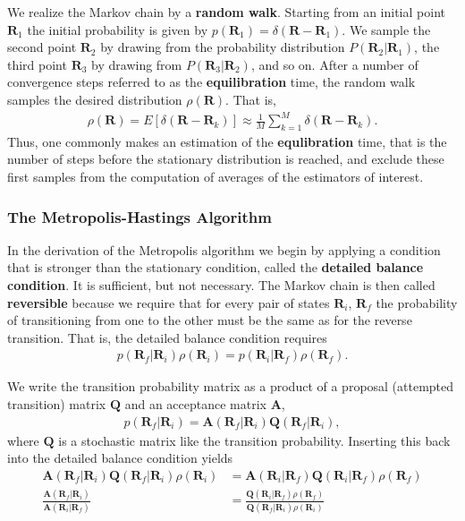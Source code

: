 \documentclass[twoside,english]{uiofysmaster}
\begin{document}
We realize the Markov chain by a \textbf{random walk}. Starting from an initial point $\bm{R}_1$ the initial probability is given by $p(\bm{R}_1) = \delta (\bm{R} - \bm{R}_1)$. We sample the
second point $\bm{R}_2$ by drawing from the probability distribution
$P(\bm{R}_2|\bm{R}_1)$, the third point $\bm{R}_3$ by drawing from
$P(\bm{R}_3 | \bm{R}_2)$, and so on. After a number of convergence steps referred to as the \textbf{equilibration} time, the random walk samples the desired distribution $\rho(\bm{R})$. That is,
\begin{align}
	\rho(\bm{R}) = E[\delta (\bm{R} - \bm{R}_k) ] \approx \frac{1}{M} \sum_{k=1}^M \delta (\bm{R} - \bm{R}_k) .
\end{align}
Thus, one commonly makes an estimation of the \textbf{equlibration} time, that is the number of steps before the stationary distribution is reached, and exclude these first samples from the computation of averages of the estimators of interest.


\subsubsection{The Metropolis-Hastings Algorithm}
In the derivation of the Metropolis algorithm we begin by applying a condition that is stronger than the stationary condition, called the \textbf{detailed balance condition}. It is sufficient, but not necessary. The Markov chain is then called \textbf{reversible} because we require that for every pair of states $\bm{R}_i$, $\bm{R}_f$ the probability of transitioning from one to the other must be the same as for the reverse transition. That is, the detailed balance condition \cite{Umrigar1999} requires
\begin{align}
	p(\bm{R}_f | \bm{R}_i) \rho (\bm{R}_i) = p(\bm{R}_i | \bm{R}_f) \rho (\bm{R}_f) .
\end{align}

We write the transition probability matrix as a product of a proposal (attempted transition) matrix $\bm{Q}$ and an acceptance matrix $\bm{A}$,
\begin{align}
	p(\bm{R}_f | \bm{R}_i) = \bm{A} (\bm{R}_f | \bm{R}_i)  \bm{Q} (\bm{R}_f | \bm{R}_i),
\end{align}
where $\bm{Q}$ is a stochastic matrix like the transition probability. Inserting this back into the detailed balance condition yields
\begin{align}
	\bm{A} (\bm{R}_f | \bm{R}_i)  \bm{Q} (\bm{R}_f | \bm{R}_i) \rho (\bm{R}_i)
	&= \bm{A} (\bm{R}_i | \bm{R}_f)  \bm{Q} (\bm{R}_i | \bm{R}_f) \rho (\bm{R}_f) \\
	\frac{\bm{A} (\bm{R}_f | \bm{R}_i) }{\bm{A} (\bm{R}_i | \bm{R}_f)} 
	&= \frac{\bm{Q} (\bm{R}_i | \bm{R}_f) \rho (\bm{R}_f)}
	{\bm{Q} (\bm{R}_f | \bm{R}_i) \rho (\bm{R}_i)}
\end{align}
\end{document}
